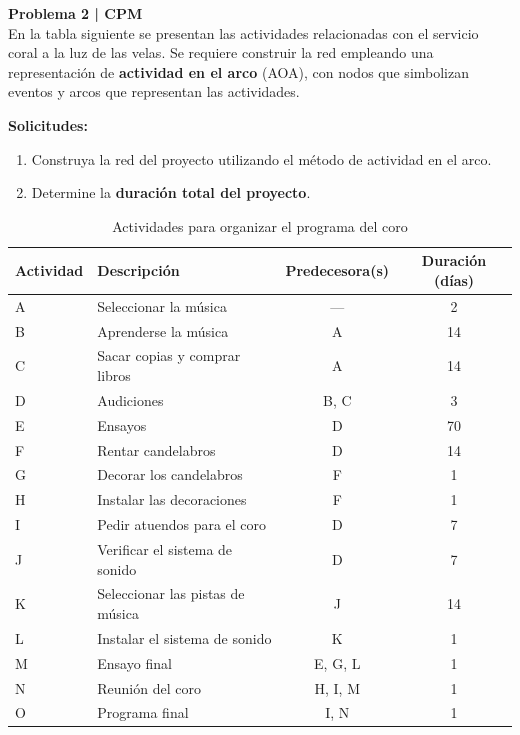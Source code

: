 \documentclass{article}
\begin{document}
\newpage

\begin{problem}
\textbf{Problema 2 | CPM}\\
En la tabla siguiente se presentan las actividades relacionadas con el servicio coral a la luz de las velas. Se requiere construir la red empleando una representación de \textbf{actividad en el arco} (AOA), con nodos que simbolizan eventos y arcos que representan las actividades.

\medskip

\textbf{Solicitudes:}
\begin{enumerate}
    \item Construya la red del proyecto utilizando el método de actividad en el arco.
    \item Determine la \textbf{duración total del proyecto}.
\end{enumerate}

\begin{table}[H]
\centering
\begin{tabular}{l p{6cm} c c}
\toprule
\textbf{Actividad} & \textbf{Descripción} & \textbf{Predecesora(s)} & \textbf{Duración (días)} \\
\midrule
A & Seleccionar la música & --- & 2 \\
\hline
B & Aprenderse la música & A & 14 \\
\hline
C & Sacar copias y comprar libros & A & 14 \\
\hline
D & Audiciones & B, C & 3 \\
\hline
E & Ensayos & D & 70 \\
\hline
F & Rentar candelabros & D & 14 \\
\hline
G & Decorar los candelabros & F & 1 \\
\hline
H & Instalar las decoraciones & F & 1 \\
\hline
I & Pedir atuendos para el coro & D & 7 \\
\hline
J & Verificar el sistema de sonido & D & 7 \\
\hline
K & Seleccionar las pistas de música & J & 14 \\
\hline
L & Instalar el sistema de sonido & K & 1 \\
\hline
M & Ensayo final & E, G, L & 1 \\
\hline
N & Reunión del coro & H, I, M & 1 \\
\hline
O & Programa final & I, N & 1 \\
\bottomrule
\end{tabular}
\caption{Actividades para organizar el programa del coro}
\end{table}

\end{problem}
\end{document}
